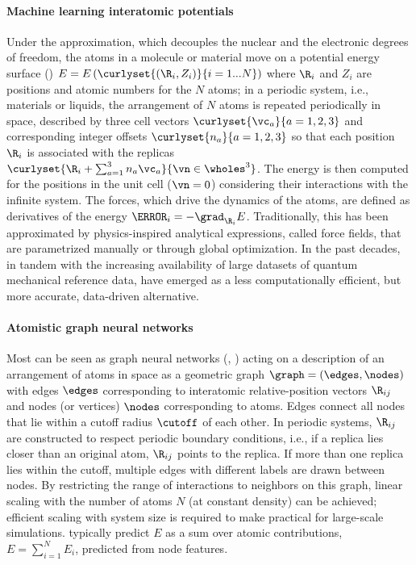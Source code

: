 \documentclass[10pt]{article}
\begin{document}
\paragraph{Machine learning interatomic potentials}
\label{sub:mlp}

Under the \cite{bo1927} approximation, which decouples the nuclear and the electronic degrees of freedom, the atoms in a molecule or material move on a potential energy surface (\pes)
$E = E\left(\curlyset{(\R_i,Z_i)}{i=1...N}\right)$
where $\R_i$ and $Z_i$ are positions and atomic numbers for the $N$ atoms; in a periodic system, i.e., materials or liquids, the arrangement of $N$ atoms is repeated periodically in space, described by three cell vectors $\curlyset{\vc_a}{a=1,2,3}$ and corresponding integer offsets $\curlyset{n_a}{a=1,2,3}$ so that each position $\R_i$ is associated with the replicas $\curlyset{\R_i + \sum_{a=1}^3 n_a \vc_a}{\vn \in \wholes^3}$. The energy is then computed for the positions in the unit cell ($\vn = 0$) considering their interactions with the infinite  system.
The forces, which drive the dynamics of the atoms, are defined as derivatives of the energy $\F_i = - \grad_{\R_i} E$.
Traditionally, this \pes has been approximated by physics-inspired analytical expressions, called force fields, that are parametrized manually or through global optimization.
In the past decades, in tandem with the increasing availability of large datasets of quantum mechanical reference data, \mlps have emerged as a less computationally efficient, but more accurate, data-driven alternative.

\paragraph{Atomistic graph neural networks}
Most \mlps can be seen as graph neural networks (\gnns, \cite{bhbszmtrsfgsbgdvanldhwkbvlp2018}) acting on a description of an arrangement of atoms in space as a geometric graph $\graph=(\edges,\nodes)$ with edges $\edges$ corresponding to interatomic relative-position vectors $\R_{ij}$ and nodes (or vertices) $\nodes$ corresponding to atoms. Edges connect all nodes that lie within a cutoff radius $\cutoff$ of each other. In periodic systems, $\R_{ij}$ are constructed to respect periodic boundary conditions, i.e., if a replica lies closer than an original atom, $\R_{ij}$ points to the replica. If more than one replica lies within the cutoff, multiple edges with different labels are drawn between nodes.
By restricting the range of interactions to neighbors on this graph, linear scaling with the number of atoms $N$ (at constant density) can be achieved; efficient scaling with system size is required to make \mlps practical for large-scale simulations.
\mlps typically predict $E$ as a sum over atomic contributions, $E=\sum_{i=1}^N E_i$, predicted from node features.
\end{document}
